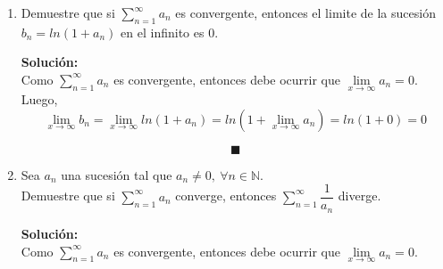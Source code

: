 \documentclass[12pt]{article}
\newenvironment{solucion}
{\begin{mdframed}[backgroundcolor=black!10]
		{\bf Solución:}\\
	}
	{
	\end{mdframed}
}
\newenvironment{preguntas}
{\begin{enumerate}\itemsep12pt
	}
	{
	\end{enumerate}
}
\newcommand{\ra}{\rightarrow}
\newcommand{\N}{\mathbb{N}}
\begin{document}
\begin{preguntas}
\begin{solucion}
\begin{enumerate}[a)]
			$$= ln(n+1) - ln(1)$$
			$$\lim\limits_{n \ra \infty} ln(n+1) = ln(\infty) = \infty = \not \exists$$
			Finalmente, la serie es divergente.
\end{enumerate}
\end{solucion}
\item Demuestre que si $\sum\limits_{n=1}^{\infty}a_n$ es convergente, entonces el limite de la sucesión $b_n=ln(1+a_n)$ en el infinito es $0$.
\begin{solucion}
Como $\sum\limits_{n=1}^{\infty}a_n$ es convergente, entonces debe ocurrir que
$\lim\limits_{x \ra \infty} a_n = 0$.\\

Luego,
$$\lim\limits_{x \ra \infty} b_n
= \lim\limits_{x \ra \infty} ln(1+a_n)
= ln(1+\lim\limits_{x \ra \infty} a_n)
= ln(1+0)
= 0$$

$$\blacksquare$$
\end{solucion}
\item Sea $a_n$ una sucesión tal que $a_n \neq 0,\ \forall n \in \N$.\\
	Demuestre que si $\sum\limits_{n=1}^{\infty}a_n$ converge, entonces $\sum\limits_{n=1}^{\infty}\dfrac{1}{a_n}$ diverge.
\begin{solucion}
Como $\sum\limits_{n=1}^{\infty}a_n$ es convergente, entonces debe ocurrir que
$\lim\limits_{x \ra \infty} a_n = 0$.\\


\end{solucion}
\end{preguntas}
\end{document}
